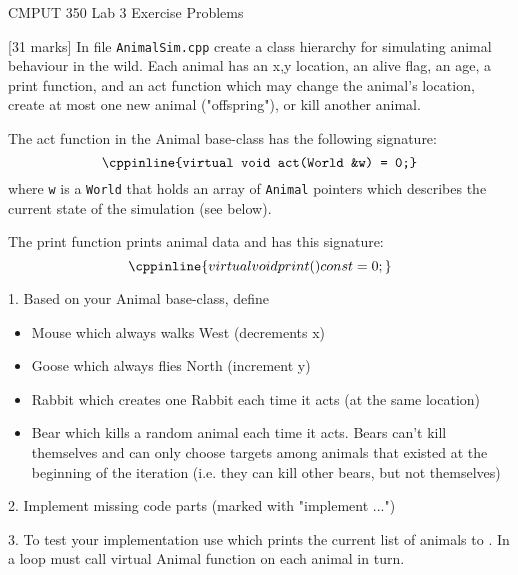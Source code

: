 \documentclass[a4paper,11pt]{article}
\begin{document}

\begin{center}
{\Large CMPUT 350 Lab 3 Exercise Problems}
\end{center}


[31 marks] In file \texttt{AnimalSim.cpp} create a class hierarchy for simulating animal behaviour in the wild. 
Each animal has an x,y location, an alive flag, an age, a print
function, and an act function which may change the animal's location, create
at most one new animal ("offspring"), or kill another animal. 

\medskip

The act function in the Animal base-class has the following signature:
   \[ \cppinline{virtual void act(World &w) = 0;} \]
where \texttt{w} is a \texttt{World} that holds an array of \texttt{Animal} pointers which describes the
current state of the simulation (see below).

\medskip

The print function prints animal data and has this signature:
\[ \cppinline{virtual void print() const = 0;} \]


\bigskip

1. Based on your Animal base-class, define
\begin{itemize}
    \item Mouse which always walks West  (decrements x)
    \item Goose which always flies North (increment y)
    \item Rabbit which creates one Rabbit each time it acts (at the same location)
    \item Bear which kills a random animal each time it acts. Bears can't kill
      themselves and can only choose targets among animals that existed at the
      beginning of the iteration (i.e. they can kill other bears, but not themselves)
\end{itemize}


2. Implement missing code parts (marked with "implement ...")

\bigskip 

3. To test your implementation use  which prints the current 
list of animals to .
In  a loop must call virtual Animal function  on each
animal in turn.
\end{document}
